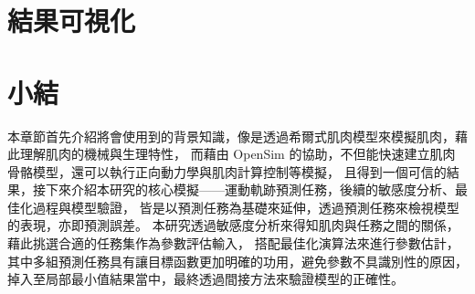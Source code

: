 
\section{結果可視化}

\section{小結}
本章節首先介紹將會使用到的背景知識，像是透過希爾式肌肉模型來模擬肌肉，藉此理解肌肉的機械與生理特性，
而藉由 OpenSim 的協助，不但能快速建立肌肉骨骼模型，還可以執行正向動力學與肌肉計算控制等模擬，
且得到一個可信的結果，接下來介紹本研究的核心模擬——運動軌跡預測任務，後續的敏感度分析、最佳化過程與模型驗證，
皆是以預測任務為基礎來延伸，透過預測任務來檢視模型的表現，亦即預測誤差。
本研究透過敏感度分析來得知肌肉與任務之間的關係，藉此挑選合適的任務集作為參數評估輸入，
搭配最佳化演算法來進行參數估計，其中多組預測任務具有讓目標函數更加明確的功用，避免參數不具識別性的原因，
掉入至局部最小值結果當中，最終透過間接方法來驗證模型的正確性。

